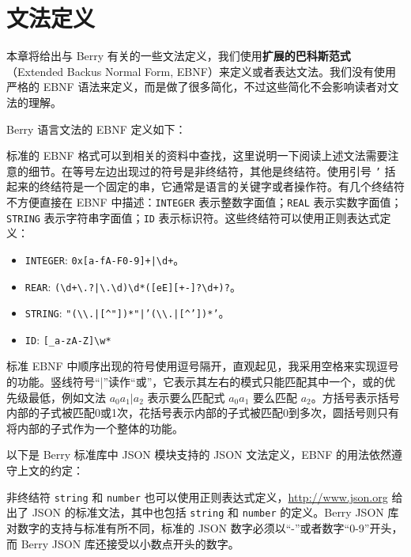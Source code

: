 \chapter{文法定义}

本章将给出与 Berry 有关的一些文法定义，我们使用\textbf{扩展的巴科斯范式}（Extended Backus Normal Form, EBNF）来定义或者表达文法。我们没有使用严格的 EBNF 语法来定义，而是做了很多简化，不过这些简化不会影响读者对文法的理解。

Berry 语言文法的 EBNF 定义如下：



标准的 EBNF 格式可以到相关的资料中查找，这里说明一下阅读上述文法需要注意的细节。在等号左边出现过的符号是非终结符，其他是终结符。使用引号 \texttt{'} 括起来的终结符是一个固定的串，它通常是语言的关键字或者操作符。有几个终结符不方便直接在 EBNF 中描述：\texttt{INTEGER} 表示整数字面值；\texttt{REAL} 表示实数字面值；\texttt{STRING} 表示字符串字面值；\texttt{ID} 表示标识符。这些终结符可以使用正则表达式定义：

\begin{itemize}
    \item \texttt{INTEGER}: \texttt{0x[a-fA-F0-9]+|\textbackslash d+}。
    \item \texttt{REAR}: \texttt{(\textbackslash d+\textbackslash.?|\textbackslash.\textbackslash d)\textbackslash d*([eE][+-]?\textbackslash d+)?}。
    \item \texttt{STRING}: \texttt{"(\textbackslash\textbackslash.|[\textasciicircum"])*"|'(\textbackslash\textbackslash.|[\textasciicircum'])*'}。
    \item \texttt{ID}: \texttt{[\_a-zA-Z]\textbackslash w*}
\end{itemize}

标准 EBNF 中顺序出现的符号使用逗号隔开，直观起见，我采用空格来实现逗号的功能。竖线符号``|''读作“或”，它表示其左右的模式只能匹配其中一个，或的优先级最低，例如文法 $a_0a_1|a_2$ 表示要么匹配式 $a_0a_1$ 要么匹配 $a_2$。方括号表示括号内部的子式被匹配0或1次，花括号表示内部的子式被匹配0到多次，圆括号则只有将内部的子式作为一个整体的功能。

以下是 Berry 标准库中 JSON 模块支持的 JSON 文法定义，EBNF 的用法依然遵守上文的约定：



非终结符 \texttt{string} 和 \texttt{number} 也可以使用正则表达式定义，\url{http://www.json.org} 给出了 JSON 的标准文法，其中也包括 \texttt{string} 和 \texttt{number} 的定义。Berry JSON 库对数字的支持与标准有所不同，标准的 JSON 数字必须以``-''或者数字``0-9''开头，而 Berry JSON 库还接受以小数点开头的数字。
